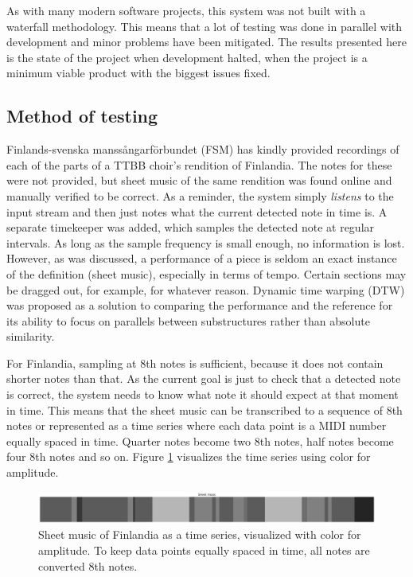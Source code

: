 As with many modern software projects, this system was not built with a waterfall methodology. This means that a lot of testing was done in parallel with development and minor problems have been mitigated. The results presented here is the state of the project when development halted, when the project is a minimum viable product with the biggest issues fixed.

\subsection{Method of testing}
Finlands-svenska manssångarförbundet (FSM) has kindly provided recordings of each of the parts of a TTBB choir's rendition of Finlandia. The notes for these were not provided, but sheet music of the same rendition was found online and manually verified to be correct. As a reminder, the system simply \textit{listens} to the input stream and then just notes what the current detected note in time is. A separate timekeeper was added, which samples the detected note at regular intervals. As long as the sample frequency is small enough, no information is lost. However, as was discussed, a performance of a piece is seldom an exact instance of the definition (sheet music), especially in terms of tempo. Certain sections may be dragged out, for example, for whatever reason. Dynamic time warping (DTW) was proposed as a solution to comparing the performance and the reference for its ability to focus on parallels between substructures rather than absolute similarity.

For Finlandia, sampling at 8th notes is sufficient, because it does not contain shorter notes than that. As the current goal is just to check that a detected note is correct, the system needs to know what note it should expect at that moment in time. This means that the sheet music can be transcribed to a sequence of 8th notes or represented as a time series where each data point is a MIDI number equally spaced in time. Quarter notes become two 8th notes, half notes become four 8th notes and so on. Figure \ref{fig:sheetEncoding} visualizes the time series using color for amplitude.

\begin{figure}[ht]
    \centering
    \includegraphics[width=\textwidth]{./images/sheetEncoding.png}
    \caption{Sheet music of Finlandia as a time series, visualized with color for amplitude. To keep data points equally spaced in time, all notes are converted 8th notes. \label{fig:sheetEncoding}}
\end{figure}

